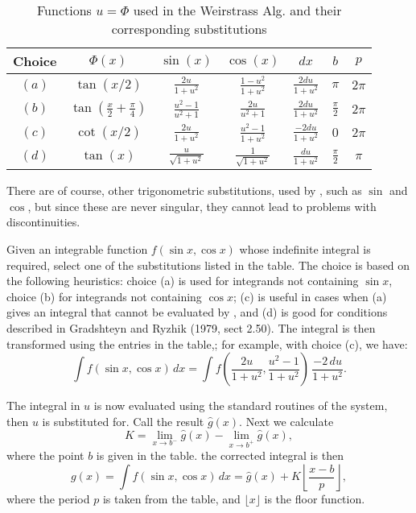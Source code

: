 \begin{table}[htbp]
\begin{tabular}{|c|c|c|c|c|c|c|} \hline
Choice & $\Phi(x)$ & $\sin(x)$ & $\cos(x)$ & $dx$ & $b$ & $p$ \\ \hline
$(a)$ & $\tan(x/2)$ & $\frac{2u}{1+u^{2}}$ & $ \frac{1-u^{2}}{1+u^{2}}$ & $\frac{2du}{1+u^{2}}$ & $\pi$ & $2\pi$ \\ \hline
$(b)$ & $\tan(\frac{x}{2}+\frac{\pi}{4})$ & $\frac{u^{2}-1}{u^{2}+1}$ & $\frac{2u}{u^{2}+1} $ & $\frac{2du}{1+u^{2}}$ & $\frac{\pi}{2}$ & $2\pi$ \\ \hline
$(c)$ & $\cot(x/2)$ & $\frac{2u}{1+u^{2}}$ & $\frac{u^{2}-1}{1+u^{2}}$ & $\frac{-2du}{1+u^{2}}$ & $0$ & $2\pi$ \\ \hline
$(d)$ & $\tan(x)$ & $\frac{u}{\sqrt{1+u^{2}}}$ & $\frac{1}{\sqrt{1+u^{2}}}$ & $\frac{du}{1+u^{2}}$ & $\frac{\pi}{2}$ & $\pi$ \\ \hline
\end{tabular}
\caption{Functions $u=\Phi$ used in the Weirstrass Alg. and their corresponding substitutions}
\end{table}

There are of course, other trigonometric substitutions, used by \REDUCE, such as $\sin$ and $\cos$, but since these are never singular, they cannot lead to problems with discontinuities.

Given an integrable function $f(\sin x,\cos x)$ whose indefinite integral is required, select one of the substitutions listed in the table. The choice is based on the following heuristics: choice (a) is used for integrands not containing $\sin x$, choice (b) for integrands not containing $\cos x$; (c) is useful in cases when (a) gives an integral that cannot be evaluated by \REDUCE, and (d) is good for conditions described in Gradshteyn and Ryzhik (1979, sect 2.50). The integral is then transformed using the entries in the table,; for example, with choice (c), we have:
\[ \int f(\sin x,\cos x)\, dx = \int f\left(\frac{2u}{1+u^{2}},\frac{u^{2}-1}{1+u^{2}}\right)\,\frac{-2\,du}{1+u^{2}} . \]

The integral in $u$ is now evaluated using the standard routines of the system, then $u$ is substituted for. Call the result $\hat{g}(x)$. Next we calculate
 \[ K=\lim_{x \rightarrow b^{-}} \hat{g}(x) - \lim_{x \rightarrow b^{+}} \hat{g}(x), \]
where the point $b$ is given in the table. the corrected integral is then
\[ g(x)=\int f(\sin x,\cos x)\,dx = \hat{g}(x)+K\left\lfloor \frac{x-b}{p} \right\rfloor, \]
where the period $p$ is taken from the table, and $\lfloor x \rfloor$ is the floor function.

